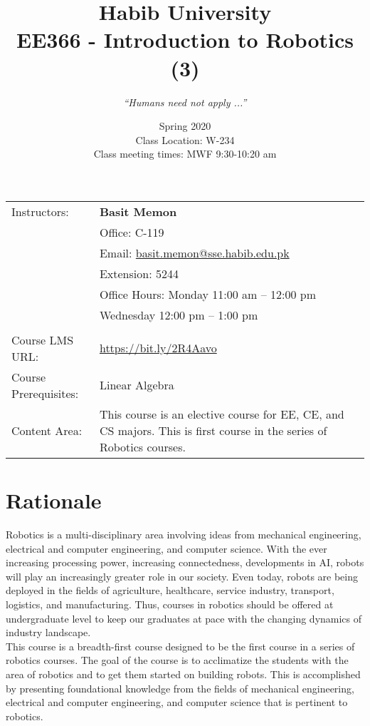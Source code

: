 \documentclass[a4paper]{article}
\title{Habib University\\EE366 - Introduction to Robotics (3)}
\author{%
\textit{``Humans need not apply ...''}\\}
\date{Spring 2020%
\\ Class Location: W-234
\\ Class meeting times: MWF 9:30-10:20 am
}
\begin{document}
\maketitle

\begin{tabular}{p{} p{}}
	Instructors: &  \textbf{Basit Memon}\\
				 & Office:  C-119\\
				 & Email: \href{mailto:basit.memon@sse.habib.edu.pk}{ basit.memon@sse.habib.edu.pk} \\
				 & Extension:  5244\\
				 & Office Hours: Monday 11:00 am -- 12:00 pm\\
				 & \qquad\qquad\qquad Wednesday 12:00 pm -- 1:00 pm\\\\				 
				 
	Course LMS URL: & \url{https://bit.ly/2R4Aavo}\\
	Course Prerequisites: & Linear Algebra \\
	Content Area: & This course is an elective course for EE, CE, and CS majors. This is first course in the series of Robotics courses.
\end{tabular}

\section{Rationale}
Robotics is a multi-disciplinary area involving ideas from mechanical engineering, electrical and computer engineering, and computer science. With the ever increasing processing power, increasing connectedness, developments in AI, robots will play an increasingly greater role in our society. Even today, robots are being deployed in the fields of agriculture, healthcare, service industry, transport, logistics, and manufacturing. Thus, courses in robotics should be offered at undergraduate level to keep our graduates at pace with the changing dynamics of industry landscape. \\  

This course is a breadth-first course designed to be the first course in a series of robotics courses. The goal of the course is to acclimatize the students with the area of robotics and to get them started on building robots. This is accomplished by presenting foundational knowledge from the fields of mechanical engineering, electrical and computer engineering, and computer science that is pertinent to robotics. 
\end{document}
